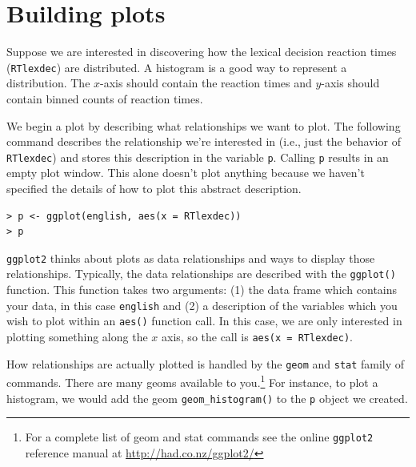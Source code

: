 \documentclass[oneside, 10pt]{article}
\begin{document}
\section{Building plots}

Suppose we are interested in discovering how the lexical decision reaction times (\texttt{RTlexdec}) are distributed. A histogram is a good way to represent a distribution. The $x$-axis should contain the reaction times and $y$-axis should contain binned counts of reaction times.

We begin a plot by describing what relationships we want to plot. The following command describes the relationship we're interested in (i.e., just the behavior of \texttt{RTlexdec}) and stores this description in the variable \texttt{p}. Calling \texttt{p} results in an empty plot window. This alone doesn't plot anything because we haven't specified the details of how to plot this abstract description.

\begin{verbatim}
> p <- ggplot(english, aes(x = RTlexdec))
> p
\end{verbatim}

\texttt{ggplot2} thinks about plots as data relationships and ways to display those relationships. Typically, the data relationships are described with the \verb!ggplot()! function. This function takes two arguments: (1) the data frame which contains your data, in this case \verb!english! and (2)  a description of the variables which you wish to plot within an \verb!aes()! function call. In this case, we are only interested in plotting something along the $x$ axis, so the call is \verb!aes(x = RTlexdec)!.

How relationships are actually plotted is handled by the \texttt{geom} and \texttt{stat} family of commands. There are many geoms available to you.\footnote{For a complete list of geom and stat commands see the online \texttt{ggplot2} reference manual at \url{http://had.co.nz/ggplot2/}} For instance, to plot a histogram, we would add the geom \verb!geom_histogram()! to the \texttt{p} object we created.
\end{document}
